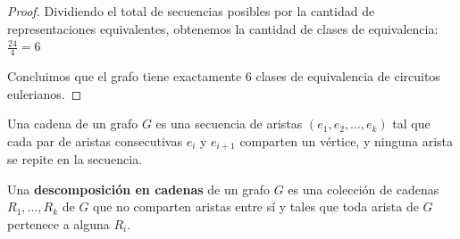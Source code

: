 \begin{proof}
    Dividiendo el total de secuencias posibles por la cantidad de representaciones equivalentes, obtenemos la cantidad de clases de equivalencia:
    \( \frac{24}{4} = 6 \)

    Concluimos que el grafo tiene exactamente 6 clases de equivalencia de circuitos eulerianos.
\end{proof}

\vspace{0.5cm}

\begin{definition}
    Una cadena de un grafo \( G \) es una secuencia de aristas \( (e_1, e_2, \ldots, e_k) \) tal que cada par de aristas consecutivas \( e_i \) y \( e_{i+1} \) comparten un vértice, y ninguna arista se repite en la secuencia.
\end{definition}

\begin{definition}
    Una \textbf{descomposición en cadenas} de un grafo \( G \) es una colección de cadenas \( R_1, \ldots, R_k \) de \( G \) que no comparten aristas entre sí y tales que toda arista de \( G \) pertenece a alguna \( R_i \).
\end{definition}

